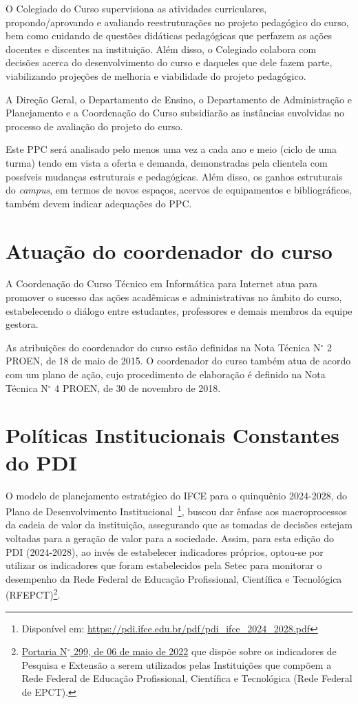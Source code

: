 \documentclass[
	12pt,				%
	openright,			%
	twoside,			%
	a4paper,			%
	chapter=TITLE,		%
	english,			%
	french,				%
	spanish,			%
	brazil,				%
	]{abntex2}
\newcommand{\nord}[1]{N$^\circ$ #1}
\begin{document}
O Colegiado do Curso supervisiona as atividades curriculares, propondo/aprovando e avaliando reestruturações no projeto pedagógico do curso, bem como cuidando de questões didáticas pedagógicas que perfazem as ações docentes e discentes na instituição. Além disso, o Colegiado colabora com decisões acerca do desenvolvimento do curso e daqueles que dele fazem parte, viabilizando projeções de melhoria e viabilidade do projeto pedagógico.

A Direção Geral, o Departamento de Ensino, o Departamento de Administração e Planejamento e a Coordenação do Curso subsidiarão as instâncias envolvidas no processo de avaliação do projeto do curso.

Este PPC será analisado pelo menos uma vez a cada ano e meio (ciclo de uma turma) tendo em vista a oferta e demanda, 
demonstradas pela clientela com possíveis mudanças estruturais e pedagógicas. Além disso, os ganhos estruturais do \textit{campus}, em termos de novos espaços, acervos de equipamentos e bibliográficos, também devem indicar adequações do PPC.

\chapter{Atuação do coordenador do curso}

A Coordenação do Curso Técnico em Informática para Internet atua para promover o sucesso das ações acadêmicas e administrativas no
âmbito do curso, estabelecendo o diálogo entre estudantes, professores e demais
membros da equipe gestora.

As atribuições do coordenador do curso estão definidas na Nota Técnica \nord{2}
PROEN, de 18 de maio de 2015. O coordenador do curso também atua de acordo
com um plano de ação, cujo procedimento de elaboração é definido na Nota Técnica
\nord{4} PROEN, de 30 de novembro de 2018.


\chapter{Políticas Institucionais Constantes do PDI}%


O modelo de planejamento estratégico do IFCE para o quinquênio
2024-2028, do Plano de Desenvolvimento Institucional~\footnote{Disponível em:
\url{https://pdi.ifce.edu.br/pdf/pdi_ifce_2024_2028.pdf}}, buscou dar ênfase aos macroprocessos da cadeia de valor da instituição,
assegurando que as tomadas de decisões estejam voltadas para a geração de valor
para a sociedade. Assim, para esta edição do PDI (2024-2028), ao invés de estabelecer indicadores próprios, optou-se
por utilizar os indicadores que foram estabelecidos pela Setec para monitorar o
desempenho da Rede Federal de Educação Profissional, Científica e Tecnológica
(RFEPCT)\footnote{\href{https://www.in.gov.br/en/web/dou/-/portaria-n-299-de-6-de-maio-de-2022-399680297}{Portaria \nord{299}, de 06 de maio de 2022}
que dispõe sobre os indicadores de Pesquisa e Extensão a serem utilizados pelas
Instituições que compõem a Rede Federal de Educação Profissional, Científica e
Tecnol\'ogica (Rede Federal de EPCT).}.
\end{document}
